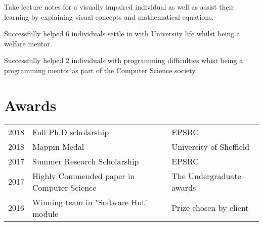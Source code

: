 \documentclass[]{deedy-resume-openfont}
\begin{document}
\begin{minipage}[t]{0.66\textwidth}
\begin{tightemize}
\item Take lecture notes for a visually impaired individual as well as assist their learning by explaining visual concepts and mathematical equations.
\end{tightemize}
\sectionsep

\begin{tightemize}
\item Successfully helped 6 individuals settle in with University life whilst being a welfare mentor.
\item Successfully helped 2 individuals with programming difficulties whist being a programming mentor as part of the Computer Science society.
\end{tightemize}
\sectionsep



\section{Awards} 
\begin{tabular}{rll}
2018	     & Full Ph.D scholarship & EPSRC\\
2018	     & Mappin Medal & University of Sheffield\\
2017	     & Summer Research Scholarship & EPSRC\\
2017	     & Highly Commended paper in Computer Science & The Undergraduate awards\\
2016	     & Winning team in "Software Hut" module  & Prize chosen by client \\
\end{tabular}
\sectionsep


\end{minipage} 
\end{document}
